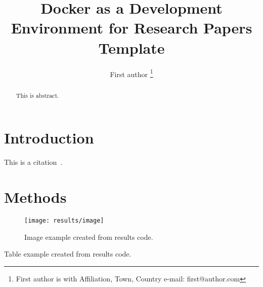 \documentclass[journal]{IEEEtran}
\begin{document}

\title{Docker as a Development Environment for Research Papers Template}

\author{First author
\thanks{First author is with Affiliation, Town, Country e-mail: first@author.com}}

\maketitle

\begin{abstract}
	This is abstract.
\end{abstract}

\section{Introduction}
This is a citation~\cite{author2000title}.

\section{Methods}

\begin{figure}
	\texttt{[image: results/image]}
	\caption{Image example created from results code.}
	\label{fig:image}
\end{figure}

\begin{table}
	\centering
	\caption{Table example created from results code.}
	\label{table:table}
	\setlength\tabcolsep{4.2pt}
	
\end{table}



\end{document}
